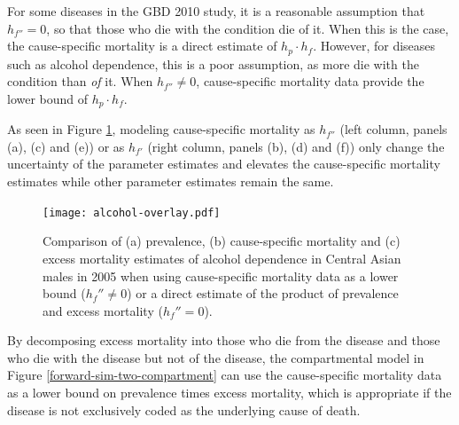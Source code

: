 For some diseases in the GBD 2010 study, it is a reasonable assumption that
$h_{f''} = 0$, so that those who die with the condition die of it.
When this is the case, the cause-specific mortality is a direct
estimate of $h_{p} \cdot h_{f}$.  However, for diseases such as alcohol
dependence, this is a poor assumption, as more die with the condition
than \emph{of} it.  When $h_{f''} \neq 0$, cause-specific mortality
data provide the lower bound of $h_{p} \cdot h_{f}$.

As seen in Figure \ref{fig:app-alcohol compare}, modeling cause-specific mortality as
$h_{f''}$ (left column, panels (a), (c) and (e)) or as $h_{f'}$ (right
column, panels (b), (d) and (f)) only change the uncertainty of the
parameter estimates and elevates the cause-specific mortality
estimates while other parameter estimates remain the same.

    \begin{figure}[h]
        \begin{center}
            \texttt{[image: alcohol-overlay.pdf]}
            \caption{Comparison of (a) prevalence,
              (b) cause-specific mortality and (c) excess
              mortality estimates of alcohol
              dependence in Central Asian males in 2005 when using
              cause-specific mortality data as a lower bound ($h_f'' \neq 0$)
              or a direct estimate of the product of
              prevalence and excess mortality ($h_f'' = 0$).}
            \label{fig:app-alcohol compare}
        \end{center}
    \end{figure}

By decomposing excess mortality into those who die from the
disease and those who die with the disease but not of the disease, the
compartmental model in Figure \ref{forward-sim-two-compartment} can
use the cause-specific mortality data as a lower bound on prevalence
times excess mortality, which is appropriate if the
disease is not exclusively coded as the underlying cause of death.
